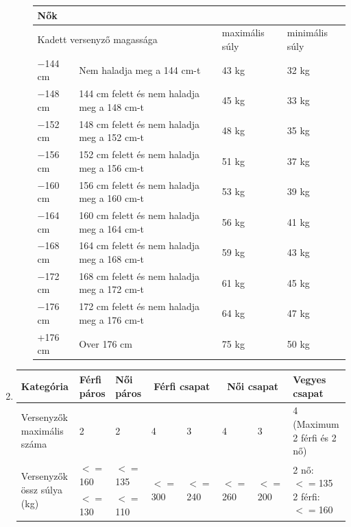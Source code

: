 \documentclass[]{report}
\begin{document}
\begin{enumerate}
\begin{enumerate}
    \begin{center}
    \begin{tabular}{ |l|l|l|l| }
     \hline
     \multicolumn{4}{|l|}{Nők} \\
     \hline
     \multicolumn{2}{|l|}{Kadett versenyző magassága} & maximális súly & minimális súly \\
     \hline
     $-$144 cm & Nem haladja meg a 144 cm-t & 43 kg & 32 kg \\
     \hline
     $-$148 cm & 144 cm felett és nem haladja meg a 148 cm-t & 45 kg & 33 kg \\
     \hline
     $-$152 cm & 148 cm felett és nem haladja meg a 152 cm-t & 48 kg & 35 kg \\
     \hline
     $-$156 cm & 152 cm felett és nem haladja meg a 156 cm-t & 51 kg & 37 kg \\
     \hline
     $-$160 cm & 156 cm felett és nem haladja meg a 160 cm-t & 53 kg & 39 kg \\
     \hline
     $-$164 cm & 160 cm felett és nem haladja meg a 164 cm-t & 56 kg & 41 kg \\
     \hline
     $-$168 cm & 164 cm felett és nem haladja meg a 168 cm-t & 59 kg & 43 kg \\
     \hline
     $-$172 cm & 168 cm felett és nem haladja meg a 172 cm-t & 61 kg & 45 kg \\
     \hline
     $-$176 cm & 172 cm felett és nem haladja meg a 176 cm-t & 64 kg & 47 kg \\
     \hline
     +176 cm & Over 176 cm & 75 kg & 50 kg \\
     \hline
    \end{tabular}
    \end{center}
  \end{enumerate}

\newpage
\item


\begin{center}
\begin{tabular}{ |m{6em}|m{4em}|m{4em}|m{4em}|m{4em}|m{4em}|m{4em}|m{6em}| }
 \hline
 Kategória & Férfi páros & Női páros & \multicolumn{2}{|c|}{Férfi csapat} & \multicolumn{2}{c|}{Női csapat} & Vegyes csapat \\
 \hline
Versenyzők maximális száma & 2 & 2 & 4 & 3 & 4 & 3 & 4 (Maximum 2 férfi és 2 nő) \\
 \hline
    \multirow{2}{6em}{Versenyzők össz súlya (kg)} & $<=$160 & $<=$135 & \multirow{2}{4em}{$<=$300} & \multirow{2}{4em}{$<=$240} & \multirow{2}{4em}{$<=$260} & \multirow{2}{4em}{$<=$200} & \multirow{2}{7em}{2 nő: $<=$135 \newline 2 férfi: $<=$160} \\
 \cline{2-3}
 & $<=$130 & $<=$110 & & & & & \\
 \hline
\end{tabular}
\end{center}

\end{enumerate}
\end{document}
